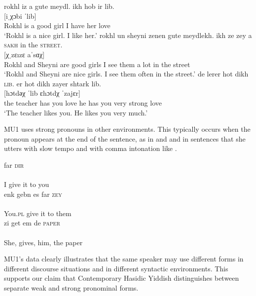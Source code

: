 \documentclass[output=paper, hidelinks]{langscibook}
\begin{document}
\ea\label{ex:MU11} \ea \glll rokhl iz a gute meydl. {ikh hob ir} lib.\\
{ } { } { } { } { } [iˌχɔbi ˈlib] \\
Rokhl is a good girl {I have her} love\\
\glt `Rokhl is a nice girl. I like her.'\label{ex:MU11b}
\ex \glll rokhl un sheyni zenen gute meydlekh. {ikh ze zey} {a \textsc{sakh}} in the \textsc{street}.\\
{ } { } { } { } { } { } [χˌzɛızɛ aˈsɑχ] \\
Rokhl and Sheyni are good girls {I see them} {a lot} in the street\\
\glt `Rokhl and Sheyni are nice girls. I see them often in the street.'\label{ex:MU11c}
\ex \glll de lerer {hot dikh} \textsc{lib}. {er hot dikh} zayer shtark lib.\\
{ } { } [hɔtdәχ ˈlib ɛhɔtdχ ˈzajɛr] {} {}\\
the teacher {has you} love {he has you} very strong love\\
\glt `The teacher likes you. He likes you very much.'\label{ex:MU11a}
\z
\z



MU1 uses strong pronouns in other environments. This typically occurs when the pronoun appears at the end of the sentence, as in  and  and in sentences that she utters with slow tempo and with comma intonation like .


\ea \ea {} {far \textsc{dir}}\\
	    [ɛχˌgɛbɛs fɑˈdir] \\
	    {I give it} {to you}\\\label{ex:MU12a}
	\ex \glll enk {gebn es} {far \textsc{zey}}\\
	    [ˈɛŋk ˈgɛbnɛs fɑˈzaı]\\
	    You.\textsc{pl} {give it} {to them}\\\label{ex:MU12b}
\ex \glll zi get em {de \textsc{paper}}\\
	    [ˈzi ˈgɛt ˈɛım dәˈpʰɛıpәr]\\
	    She, gives, him, {the paper}\\\label{ex:MU12c}
\z
\z

MU1’s data clearly illustrates that the same speaker may use different forms in different discourse situations and in different syntactic environments. This supports our claim that Contemporary Hasidic Yiddish distinguishes between separate weak and strong pronominal forms. 
\end{document}

